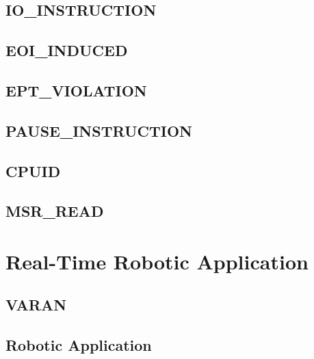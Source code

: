 \documentclass[MMR,Master,english]{twbook}
\begin{document}
\section{IO\_INSTRUCTION}
\section{EOI\_INDUCED}
\section{EPT\_VIOLATION}
\section{PAUSE\_INSTRUCTION}
\section{CPUID}
\section{MSR\_READ}

\clearpage

\chapter{Real-Time Robotic Application}\label{cha:real-time-testing}

\section{VARAN}
\section{Robotic Application}
\clearpage
\end{document}
